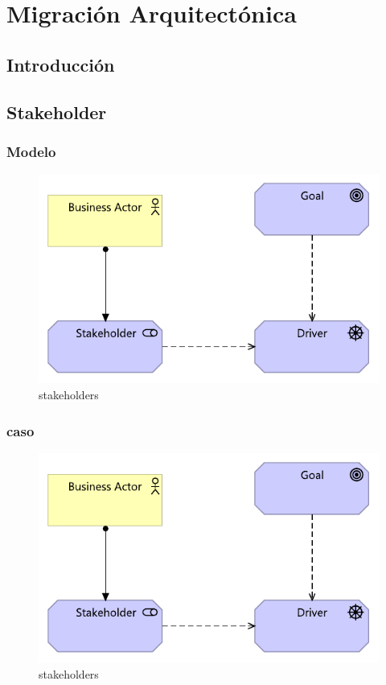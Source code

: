 \chapter{Migración Arquitectónica}
\section{Introducción}
\newpage
\section{Stakeholder}
\subsection{Modelo}
\begin{figure}[h!]
	\centering
	\includegraphics[width=0.7\linewidth]{arquitectura/imgs/stakeholders}
	\caption{stakeholders}
	\label{fig:stakeholders}
\end{figure}
\newpage
\subsection{caso}
\begin{figure}[h!]
	\centering
	\includegraphics[width=0.7\linewidth]{arquitectura/imgs/stakeholders}
	\caption{stakeholders}
	\label{fig:stakeholders}
\end{figure}
\newpage